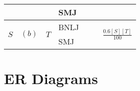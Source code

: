 \documentclass{article}
\newcommand{\sol}[1]{\iftoggle{showsolutions}{\textcolor{red}{#1}}{\phantom{#1}}}
\begin{document}
\begin{center}
\begin{tabular}{|l|l|l|l|l|l|l|}
                         &                        &                      & SMJ  & \sol{$(b)$}    & \sol{$SC(0.5[R]) + 0.5[R][S]$} & \\\hline
    \multirow{2}{*}{$S$} & \multirow{2}{*}{$(b)$} & \multirow{2}{*}{$T$} & BNLJ & \sol{None}     & \sol{$\bnlj{[S]}{0.6[T]}$}     & \multirow{2}{*}{$\frac{0.6[S][T]}{100}$} \\\cline{4-6}
                         &                        &                      & SMJ  & \sol{$(c, b)$} & \sol{$\smj{[S]}{0.6[T]}$}      & \\\hline
  \end{tabular}
\end{center}

\section{ER Diagrams}
\newcommand{\basedrawing}{
  \node[draw] (R) at (0, 0) {$R$};
  \node[circle, draw] (Ra) at (-0.5, 1) {\underline{$a$}};
  \node[circle, draw] (Rb) at (0.5, 1) {$b$};

  \node[diamond, draw] (L) at (1.5, 0) {$L$};

  \node[draw] (S) at (3, 0) {$S$};
  \node[circle, draw] (Sa) at (2.5, 1) {\underline{$b$}};
  \node[circle, draw] (Sb) at (3.5, 1) {$c$};
}
\end{document}
